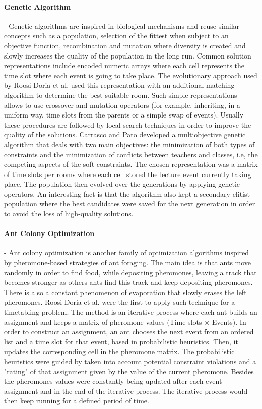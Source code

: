 \paragraph{\textbf{Genetic Algorithm}}- Genetic algorithms are inspired in biological mechanisms and reuse similar concepts such as a population, selection of the fittest when subject to an objective function, recombination and mutation where diversity is created and slowly increases the quality of the population in the long run. Common solution representations include encoded numeric arrays where each cell represents the time slot where each event is going to take place. The evolutionary approach used by Roosi-Doria et al. \citep{rossi2003comparison} used this representation with an additional matching algorithm to determine the best suitable room. Such simple representations allows to use crossover and mutation operators (for example, inheriting, in a uniform way, time slots from the parents or a simple swap of events). Usually these procedures are followed by local search techniques in order to improve the quality of the solutions. Carrasco and Pato \citep{carrasco2001multiobjective} developed a multiobjective genetic algorithm that deals with two main objectives: the minimization of both types of constraints and the minimization of conflicts between teachers and classes, i.e, the competing aspects of the soft constraints. The chosen representation was a matrix of time slots per rooms where each cell stored the lecture event currently taking place. The population then evolved over the generations  by applying genetic operators. An interesting fact is that the algorithm also kept a secondary elitist population where the best candidates were saved for the next generation in order to avoid the loss of high-quality solutions. 

\paragraph{\textbf{Ant Colony Optimization}} - Ant colony optimization is another family of optimization algorithms inspired by pheromone-based strategies of ant foraging. The main idea is that ants move randomly in order to find food, while depositing pheromones, leaving a track that becomes stronger as others ants find this track and keep depositing pheromones. There is also a constant phenomenon of evaporation that slowly erases the left pheromones. Roosi-Doria et al. \citep{rossi2003comparison} were the first to apply such technique for a timetabling problem. The method is an iterative process where each ant builds an assignment and keeps a matrix of pheromone values (Time slots $\times$ Events). In order to construct an assignment, an ant chooses the next event from an ordered list and a time slot for that event, based in probabilistic heuristics. Then, it updates the corresponding cell in the pheromone matrix. The probabilistic heuristics were guided by taken into account potential constraint violations and a "rating" of that assignment given by the value of the current pheromone. Besides the pheromones values were constantly being updated after each event assignment and in the end of the iterative process. The iterative process would then keep running for a defined period of time. 

